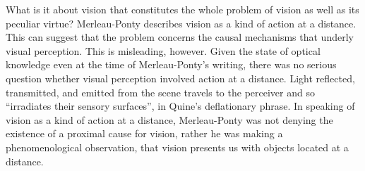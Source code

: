 \documentclass[12pt]{article}
\begin{document}
What is it about vision that constitutes the whole problem of vision as well as its peculiar virtue? Merleau-Ponty describes vision as a kind of action at a distance. This can suggest that the problem concerns the causal mechanisms that underly visual perception. This is misleading, however. Given the state of optical knowledge even at the time of Merleau-Ponty's writing, there was no serious question whether visual perception involved action at a distance. Light reflected, transmitted, and emitted from the scene travels to the perceiver and so ``irradiates their sensory surfaces'', in Quine's deflationary phrase. In speaking of vision as a kind of action at a distance, Merleau-Ponty was not denying the existence of a proximal cause for vision, rather he was making a phenomenological observation, that vision presents us with objects located at a distance. 





 
 
\end{document}
